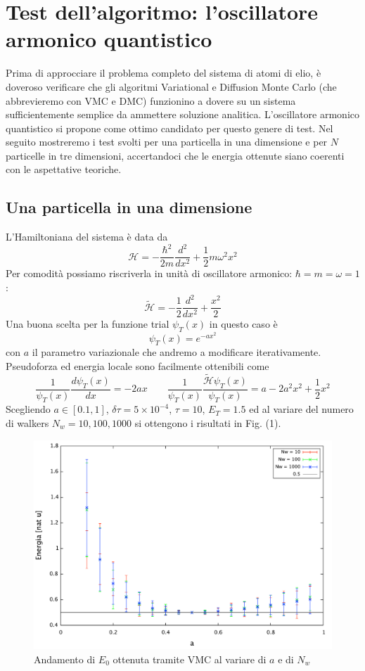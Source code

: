 \documentclass[11pt,a4paper]{article}
\begin{document}
\section{Test dell'algoritmo: l'oscillatore armonico quantistico}
Prima di approcciare il problema completo del sistema di atomi di elio, è doveroso verificare che gli algoritmi Variational e Diffusion Monte Carlo (che abbrevieremo con VMC e DMC) funzionino a dovere su un sistema sufficientemente semplice da ammettere soluzione analitica. L'oscillatore armonico quantistico si propone come ottimo candidato per questo genere di test. Nel seguito mostreremo i test svolti per una particella in una dimensione e per $N$ particelle in tre dimensioni, accertandoci che le energia ottenute siano coerenti con le aspettative teoriche. 
\subsection{Una particella in una dimensione}
L'Hamiltoniana del sistema è data da
\[
\mathcal{H} = -\frac{\hbar^2}{2m}\frac{d^2}{dx^2} + \frac{1}{2}m\omega^2x^2
\]
Per comodità possiamo riscriverla in unità di oscillatore armonico: $\hbar = m = \omega = 1$:
\begin{equation}
\mathcal{\tilde{H}} = -\frac{1}{2}\frac{d^2}{dx^2} + \frac{x^2}{2}
\end{equation}
Una buona scelta per la funzione trial $\psi_T(x)$ in questo caso è
\begin{equation}
\psi_T(x) = e^{-ax^2}
\end{equation}
con $a$ il parametro variazionale che andremo a modificare iterativamente. Pseudoforza ed energia locale sono facilmente ottenibili come
\begin{equation}
\frac{1}{\psi_T(x)} \frac{d\psi_T(x)}{dx} = -2ax \qquad \frac{1}{\psi_T(x)} \frac{\mathcal{\tilde{H}}\psi_T(x)}{\psi_T(x)} = a - 2a^2x^2 + \frac{1}{2}x^2
\end{equation}
Scegliendo $a \in [0.1,1]$, $\delta \tau = 5\times 10^{-4}$, $\tau = 10$, $E_T = 1.5$ ed al variare del numero di walkers $N_w = 10,100,1000$ si ottengono i risultati in Fig. (1). 
\begin{figure}[!h]
\centering
\includegraphics[scale=0.4]{Img/ho_var}
\caption{Andamento di $E_0$ ottenuta tramite VMC al variare di $a$ e di $N_w$}
\end{figure}
\end{document}

